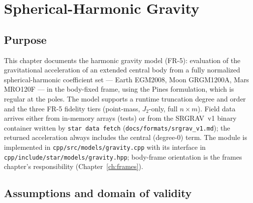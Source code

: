 \chapter{Spherical-Harmonic Gravity}
\label{ch:gravity}

\section{Purpose}
\label{sec:gravity:purpose}

This chapter documents the harmonic gravity model (FR-5): evaluation of
the gravitational acceleration of an extended central body from a fully
normalized spherical-harmonic coefficient set --- Earth EGM2008, Moon
GRGM1200A, Mars MRO120F --- in the body-fixed frame, using the Pines
formulation, which is regular at the poles. The model supports a runtime
truncation degree and order and the three FR-5 fidelity tiers
(point-mass, $J_2$-only, full $n \times m$). Field data arrives either
from in-memory arrays (tests) or from the SRGRAV~v1 binary container
written by \texttt{star data fetch}
(\texttt{docs/formats/srgrav\_v1.md}); the returned acceleration always
includes the central (degree-0) term. The module is implemented in
\texttt{cpp/src/models/gravity.cpp} with its interface in
\texttt{cpp/include/star/models/gravity.hpp}; body-frame orientation is
the frames chapter's responsibility (Chapter~\ref{ch:frames}).

\section{Assumptions and domain of validity}
\label{sec:gravity:domain}

